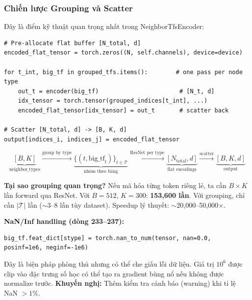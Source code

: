 \documentclass[12pt,a4paper]{article}
\begin{document}
\subsubsection{Chiến lược Grouping và Scatter}

Đây là điểm kỹ thuật quan trọng nhất trong NeighborTfsEncoder:

\begin{codebox}[title={encoders.py -- forward() -- nhóm theo kiểu node}]
\begin{lstlisting}
# Pre-allocate flat buffer [N_total, d]
encoded_flat_tensor = torch.zeros((N, self.channels), device=device)

for t_int, big_tf in grouped_tfs.items():        # one pass per node type
    out_t = encoder(big_tf)                       # [N_t, d]
    idx_tensor = torch.tensor(grouped_indices[t_int], ...)
    encoded_flat_tensor[idx_tensor] = out_t       # scatter back

# Scatter [N_total, d] -> [B, K, d]
output[indices_i, indices_j] = encoded_flat_tensor
\end{lstlisting}
\end{codebox}

\begin{mathbox}[title={Sơ đồ Grouping-Encode-Scatter}]
\begin{equation}
  \underbrace{[B, K]}_{\text{neighbor\_types}}
  \xrightarrow{\text{group by type}}
  \underbrace{\{(t, \text{big\_tf}_t)\}_{t \in \mathcal{T}}}_{\text{nhóm theo bảng}}
  \xrightarrow{\text{ResNet per type}}
  \underbrace{[N_\text{total}, d]}_{\text{flat encodings}}
  \xrightarrow{\text{scatter}}
  \underbrace{[B, K, d]}_{\text{output}}
\end{equation}
\end{mathbox}

\begin{insightbox}
\textbf{Tại sao grouping quan trọng?} Nếu mã hóa từng token riêng lẻ,
ta cần $B \times K$ lần forward qua ResNet. Với $B=512$, $K=300$: \textbf{153,600 lần}.
Với grouping, chỉ cần $|\mathcal{T}|$ lần ($\sim$3--8 lần tùy dataset).
Speedup lý thuyết: $\sim$20,000--50,000$\times$.
\end{insightbox}

\begin{issuebox}
\textbf{NaN/Inf handling (dòng 233--237):}
\begin{lstlisting}[numbers=none]
big_tf.feat_dict[stype] = torch.nan_to_num(tensor, nan=0.0, posinf=1e6, neginf=-1e6)
\end{lstlisting}
Đây là biện pháp phòng thủ nhưng có thể che giấu lỗi dữ liệu. Giá trị $10^6$
được clip vào đặc trưng số học có thể tạo ra gradient bùng nổ nếu không được
normalize trước. \textbf{Khuyến nghị:} Thêm kiểm tra cảnh báo (warning) khi
tỉ lệ NaN $>1\%$.
\end{issuebox}
\end{document}
